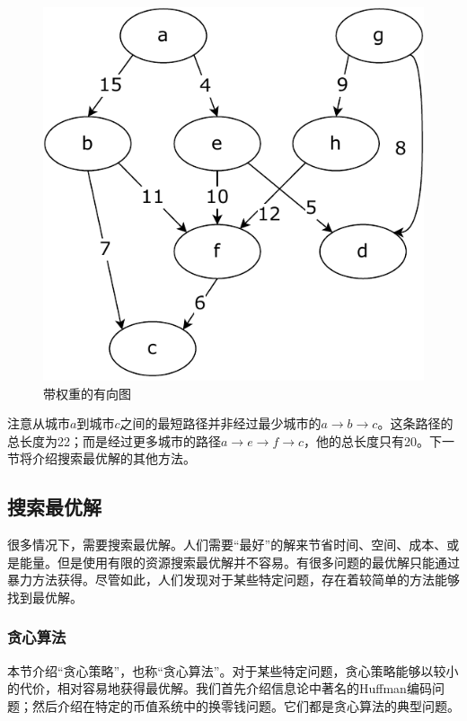 \documentclass[b5paper]{ctexart}
\begin{document}
\begin{figure}[htbp]
 \centering
 \includegraphics[scale=0.5]{img/weighted-dag}
 \caption{带权重的有向图}
 \label{fig:weighted-dag}
\end{figure}

注意从城市$a$到城市$c$之间的最短路径并非经过最少城市的$a \to b \to c$。这条路径的总长度为22；而是经过更多城市的路径$a \to e \to f \to c$，他的总长度只有20。下一节将介绍搜索最优解的其他方法。

\subsection{搜索最优解}

很多情况下，需要搜索最优解。人们需要“最好”的解来节省时间、空间、成本、或是能量。但是使用有限的资源搜索最优解并不容易。有很多问题的最优解只能通过暴力方法获得。尽管如此，人们发现对于某些特定问题，存在着较简单的方法能够找到最优解。

\subsubsection{贪心算法}

本节介绍“贪心策略”，也称“贪心算法”。对于某些特定问题，贪心策略能够以较小的代价，相对容易地获得最优解。我们首先介绍信息论中著名的Huffman编码问题；然后介绍在特定的币值系统中的换零钱问题。它们都是贪心算法的典型问题。
\end{document}
